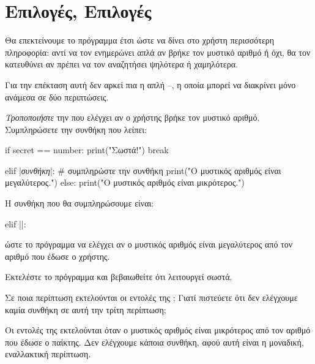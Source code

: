 \documentclass[a4paper,11pt,oneside]{book}
\begin{document}
\section{Επιλογές, Επιλογές}

Θα επεκτείνουμε το πρόγραμμα έτσι ώστε να δίνει στο χρήστη περισσότερη πληροφορία: αντί να τον ενημερώνει απλά αν βρήκε τον μυστικό αριθμό ή όχι, θα τον κατευθύνει αν πρέπει να τον αναζητήσει ψηλότερα ή χαμηλότερα.

Για την επέκταση αυτή δεν αρκεί πια η απλή --, η οποία μπορεί να διακρίνει μόνο ανάμεσα σε δύο περιπτώσεις. 

\begin{step}
\emph{Τροποποιήστε} την  που ελέγχει αν ο χρήστης βρήκε τον μυστικό αριθμό. Συμπληρώσετε την συνθήκη που λείπει:

\begin{pyplain}
    if secret == number:
        print("Σωστά!")
        break
\end{pyplain}
\begin{pynew}
    elif |\textrm{\textit{συνθήκη}}|: # συμπληρώστε την συνθήκη
        print("Ο μυστικός αριθμός είναι μεγαλύτερος.")
    else:
        print("Ο μυστικός αριθμός είναι μικρότερος.")
\end{pynew}

\begin{answer}
Η συνθήκη που θα συμπληρώσουμε είναι:

\begin{pyplain}
elif ||:
\end{pyplain}

ώστε το πρόγραμμα να ελέγχει αν ο μυστικός αριθμός είναι μεγαλύτερος από τον αριθμό που έδωσε ο χρήστης.
\end{answer}

Εκτελέστε το πρόγραμμα και βεβαιωθείτε ότι λειτουργεί σωστά. 

Σε ποια περίπτωση εκτελούνται οι εντολές της ; Γιατί πιστεύετε ότι δεν ελέγχουμε καμία συνθήκη σε αυτή την τρίτη περίπτωση;

\begin{answer}
Οι εντολές της  εκτελούνται όταν ο μυστικός αριθμός είναι μικρότερος από τον αριθμό που έδωσε ο παίκτης. Δεν ελέγχουμε κάποια συνθήκη, αφού αυτή είναι η μοναδική, εναλλακτική περίπτωση.
\end{answer}
\end{step}
\end{document}
